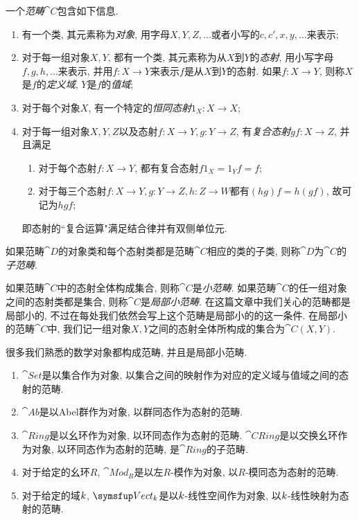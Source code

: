一个\emph{范畴}$\cat{C}$包含如下信息.
\begin{enumerate}
  \item 有一个类, 其元素称为\emph{对象}, 用字母$X, Y, Z, \dotsc$或者小写的$c, c', x, y, \dotsc$来表示;
  \item 对于每一组对象$X, Y$, 都有一个类, 其元素称为从$X$到$Y$的\emph{态射}, 用小写字母$f, g, h, \dotsc$来表示, 并用$f\colon X\to Y$来表示$f$是从$X$到$Y$的态射. 如果$f\colon X\to Y$, 则称$X$是$f$的\emph{定义域}, $Y$是$f$的\emph{值域};
  \item 对于每个对象$X$, 有一个特定的\emph{恒同态射}$1_X\colon X\to X$;
  \item 对于每一组对象$X, Y, Z$以及态射$f\colon X\to Y, g\colon Y\to Z$, 有\emph{复合态射}$gf\colon X\to Z$, 并且满足
  \begin{enumerate}
    \item 对于每个态射$f\colon X\to Y$, 都有复合态射$f1_{X}=1_{Y}f=f$;
    \item 对于每三个态射$f\colon X\to Y, g\colon Y\to Z, h\colon Z\to W$都有$(hg)f=h(gf)$, 故可记为$hgf$;
  \end{enumerate}
  即态射的``复合运算"满足结合律并有双侧单位元.
\end{enumerate}

如果范畴$\cat{D}$的对象类和每个态射类都是范畴$\cat{C}$相应的类的子类, 则称$\cat{D}$为$\cat{C}$的\emph{子范畴}.

如果范畴$\cat{C}$中的态射全体构成集合, 则称$\cat{C}$是\emph{小范畴}. 如果范畴$\cat{C}$的任一组对象之间的态射类都是集合, 则称$\cat{C}$是\emph{局部小范畴}. 在这篇文章中我们关心的范畴都是局部小的, 不过在每处我们依然会写上这个范畴是局部小的的这一条件. 在局部小的范畴$\cat{C}$中, 我们记一组对象$X, Y$之间的态射全体所构成的集合为$\cat{C} (X, Y)$.

\begin{example}
  很多我们熟悉的数学对象都构成范畴, 并且是局部小范畴.
  \begin{enumerate}\label{exm:concretecategory}
    \item $\cat{Set}$是以集合作为对象, 以集合之间的映射作为对应的定义域与值域之间的态射的范畴.
    \item $\cat{Ab}$是以Abel群作为对象, 以群同态作为态射的范畴.
    \item $\cat{Ring}$是以幺环作为对象, 以环同态作为态射的范畴. $\cat{CRing}$是以交换幺环作为对象, 以环同态作为态射的范畴, 是$\cat{Ring}$的子范畴.
    \item 对于给定的幺环$R$, $\cat{Mod}_R$是以左$R$-模作为对象, 以$R$-模同态为态射的范畴.
    \item 对于给定的域$k$, $\cat{Vect}_{\kk}$是以$k$-线性空间作为对象, 以$k$-线性映射为态射的范畴.
  \end{enumerate}
\end{example}

